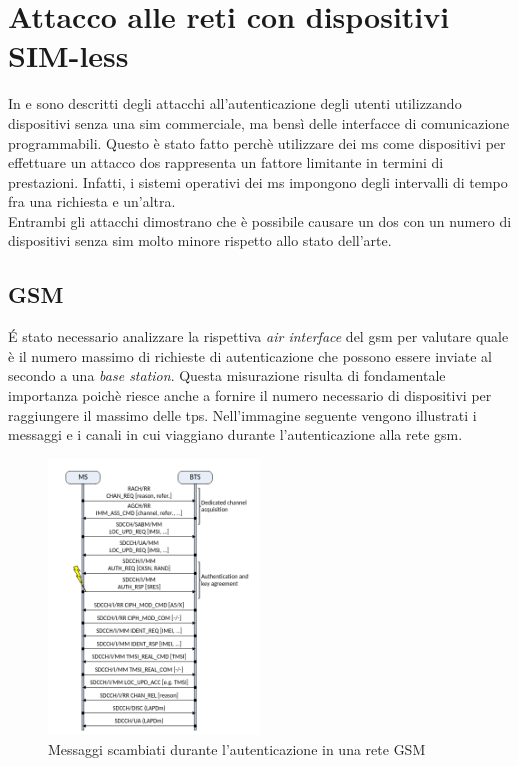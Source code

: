 \clearpage

\section{Attacco alle reti con dispositivi SIM-less}
In \cite{umts-dos} e \cite{gsm-dos-simless} sono descritti degli attacchi all'autenticazione degli utenti utilizzando dispositivi senza una \gls{sim} commerciale, ma bensì delle interfacce di comunicazione 
programmabili. Questo è stato fatto perchè utilizzare dei \gls{ms} come dispositivi per effettuare un attacco \gls{dos} rappresenta un fattore limitante in termini di prestazioni. Infatti, 
i sistemi operativi dei \gls{ms} impongono degli intervalli di tempo fra una richiesta e un'altra.\\
Entrambi gli attacchi dimostrano che è possibile causare un \gls{dos} con un numero di dispositivi senza \gls{sim} molto minore rispetto allo stato dell'arte. 
\subsection{GSM}
É stato necessario analizzare la rispettiva \textit{air interface} del \gls{gsm} per valutare quale è il numero massimo di richieste di autenticazione 
che possono essere inviate al secondo a una \textit{base station}. Questa misurazione risulta di fondamentale importanza poichè riesce anche a fornire il numero necessario 
di dispositivi per raggiungere il massimo delle \gls{tps}.
Nell'immagine seguente vengono illustrati i messaggi e i canali in cui viaggiano durante l'autenticazione alla rete \gls{gsm}.
\begin{figure}[h]
    \centering
    \includegraphics[width=0.5\textwidth]{images/gsm-air-channel.png}
    \caption{Messaggi scambiati durante l'autenticazione in una rete GSM\cite{gsm-dos-simless}}
\end{figure}


